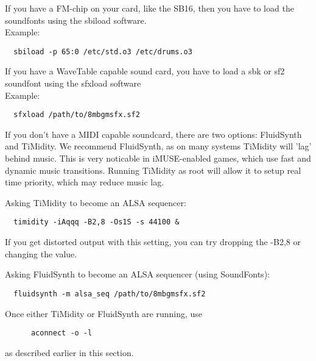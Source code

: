 If you have a FM-chip on your card, like the SB16, then you have to load
the soundfonts using the sbiload software. \\
Example:
\begin{verbatim}
  sbiload -p 65:0 /etc/std.o3 /etc/drums.o3
\end{verbatim}
%
If you have a WaveTable capable sound card, you have to load a sbk or sf2
soundfont using the sfxload software\\
Example:
\begin{verbatim}
  sfxload /path/to/8mbgmsfx.sf2
\end{verbatim}
%
If you don't have a MIDI capable soundcard, there are two options: FluidSynth
and TiMidity. We recommend FluidSynth, as on many systems TiMidity will 'lag'
behind music. This is very noticable in iMUSE-enabled games, which use fast
and dynamic music transitions. Running TiMidity as root will allow it to
setup real time priority, which may reduce music lag.

Asking TiMidity to become an ALSA sequencer:
\begin{verbatim}
  timidity -iAqqq -B2,8 -Os1S -s 44100 &
\end{verbatim}
If you get distorted output with this setting, you can try dropping the 
-B2,8 or changing the value.

Asking FluidSynth to become an ALSA sequencer (using SoundFonts):
\begin{verbatim}
  fluidsynth -m alsa_seq /path/to/8mbgmsfx.sf2
\end{verbatim}
%
Once either TiMidity or FluidSynth are running, use
\begin{verbatim}
      aconnect -o -l
\end{verbatim}
as described earlier in this section.
